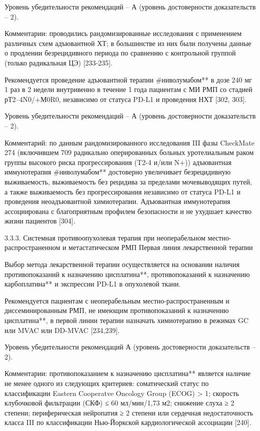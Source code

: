 Уровень убедительности рекомендаций – А (уровень достоверности доказательств – 2).

Комментарии: проводились рандомизированные исследования с применением различных схем адъювантной ХТ; в большинстве из них были получены данные о продлении безрецидивного периода по сравнению с контрольной группой (только радикальная ЦЭ) [233-235].

Рекомендуется проведение адъювантной терапии #ниволумабом** в дозе 240 мг 1 раз в 2 недели внутривенно в течение 1 года пациентам с МИ РМП со стадией рТ2–4N0/+М0R0, независимо от статуса PD-L1 и проведения НХТ [302, 303].

Уровень убедительности рекомендаций – А (уровень достоверности доказательств – 2).

Комментарий: по данным рандомизированного исследования III фазы CheckMate 274 (включившем 709 радикально оперированных больных уротелиальным раком группы высокого риска прогрессирования (T2-4 и/или N+)) адъювантная иммунотерапия #ниволумабом** достоверно увеличивает безрецидивную выживаемость, выживаемость без рецидива за пределами мочевыводящих путей, а также выживаемость без прогрессирования независимо от статуса PD-L1 и проведения неоадъювантной химиотерапии. Адъювантная иммунотерапия ассоциирована с благоприятным профилем безопасности и не ухудшает качество жизни пациентов [304].

3.3.3. Системная противоопухолевая терапия при неоперабельном местно-распространенном и метастатическом РМП
Первая линия лекарственной терапии

Выбор метода лекарственной терапии осуществляется на основании наличия противопоказаний к назначению цисплатина**, противопоказаний к назначению карбоплатина** и экспрессии PD-L1 в опухолевой ткани.

Рекомендуется пациентам с неоперабельным местно-распространенным и диссеминированным РМП, не имеющим противопоказаний к назначению цисплатина**, в первой линии терапии назначать химиотерапию в режимах GC или MVAC или DD-MVAC [234,239].

Уровень убедительности рекомендаций А (уровень достоверности доказательств – 2).

Комментарии: противопоказанием к назначению цисплатина** является наличие не менее одного из следующих критериев: соматический статус по классификации Eastern Cooperatve Oncology Group (ECOG) > 1; скорость клубочковой фильтрации (СКФ) ≤ 60 мл/мин/1,73 м2; снижение слуха ≥ 2 степени; периферическая нейропатия ≥ 2 степени или сердечная недостаточность класса III по классификации Нью-Йоркской кардиологической ассоциации [240].

